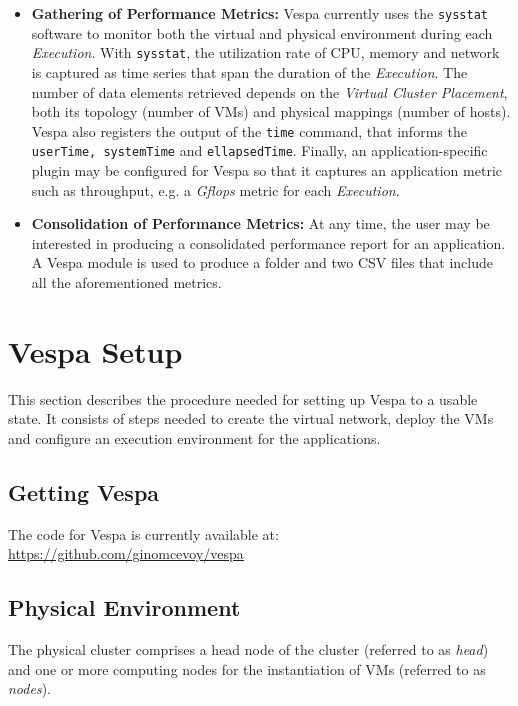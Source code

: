 \documentclass[11pt]{article}
\begin{document}
\begin{itemize}
  \item \textbf{Gathering of Performance Metrics:} Vespa currently uses the \texttt{sysstat} software to monitor both the virtual and physical environment during each \emph{Execution}. With \texttt{sysstat}, the utilization rate of CPU, memory and network is captured as time series that span the duration of the \emph{Execution}. The number of data elements retrieved depends on the \emph{Virtual Cluster Placement}, both its topology (number of VMs) and physical mappings (number of hosts). Vespa also registers the output of the \texttt{time} command, that informs the \texttt{userTime, systemTime} and \texttt{ellapsedTime}. Finally, an application-specific plugin may be configured for Vespa so that it captures an application metric such as throughput, e.g. a \emph{Gflops} metric for each \emph{Execution}.

  \item \textbf{Consolidation of Performance Metrics:} At any time, the user may be interested in producing a consolidated performance report for an application. A Vespa module is used to produce a folder and two CSV files that include all the aforementioned metrics.  
\end{itemize}

\section{Vespa Setup}
\label{sec:setup}

This section describes the procedure needed for setting up Vespa to a usable state. It consists of steps needed to create the virtual network, deploy the VMs and configure an execution environment for the applications.

\subsection{Getting Vespa}

The code for Vespa is currently available at: \url{https://github.com/ginomcevoy/vespa}

\subsection{Physical Environment}

The physical cluster comprises a head node of the cluster (referred to as \textit{head}) and one or more computing nodes for the instantiation of VMs (referred to as \textit{nodes}). 
\end{document}
